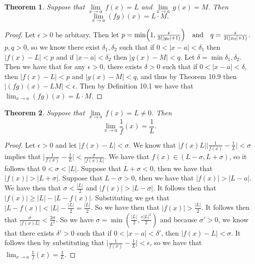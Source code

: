 \documentclass[12pt]{article}
\providecommand{\abs}[1]{\lvert #1 \rvert}
\providecommand{\sarr}{\rightarrow}
\renewcommand{\_}[1]{\underline{ #1 }}
\newtheorem{theorem}{Theorem}[section]
\theoremstyle{definition}
\numberwithin{equation}{subsection}
\begin{document}
\begin{theorem} Suppose that $\underset{x \sarr a}{\lim} \, f(x) = L$ and $\underset{x \sarr a}{\lim} \, g(x) = M$.  Then
\[
\lim_{x \sarr a} (f g)(x) = L \cdot M.
\]
\end{theorem}

\begin{proof}
Let $\epsilon > 0$ be arbitary. Then let $p = \min \Bigl( 1, \frac{\epsilon}{2(\abs{y_0} + 1)} \Bigr) \quad \text{and} \quad q = \frac{\epsilon}{2 (\abs{x_0} + 1)}$. $p,q > 0$, so we know there exist $\delta_1,\delta_2$ such that if $0 < \abs{x - a} < \delta_1$ then $\abs{f(x) - L} < p$ and if $\abs{x - a} < \delta_2$ then $\abs{g(x) - M} < q$. Let $\delta = \min{\delta_1, \delta_2}$. Then we have that for any $\epsilon > 0$, there exists $\delta > 0$ such that if $0 < \abs{x - a} < \delta$, then $\abs{f(x) - L} < p$ and $\abs{g(x) - M} < q$, and thus by Theorem 10.9 then $\abs{(fg)(x) - LM} < \epsilon$. Then by Definition 10.1 we have that $\lim_{x \to a}(fg)(x) = L \cdot M$.
\end{proof}

\begin{theorem}  Suppose that $\underset{x \sarr a}{\lim} \, f(x) = L \neq 0$.  Then
\[
\lim_{x \sarr a} \frac{1}{f}(x) = \frac{1}{L}.
\]
\end{theorem}

\begin{proof}
Let $\epsilon > 0$ and let $\abs{f(x) - L} < \sigma$. We know that $\abs{f(x)L} \abs{\frac{1}{f(x)} - \frac{1}{L}} < \sigma$ implies that $\abs{\frac{1}{f(x)} - \frac{1}{L}} < \frac{\sigma}{\abs{f(x)L}}$. We have that $f(x) \in (L - \sigma, L + \sigma)$, so it follows that $0 < \sigma < \abs{L}$. Suppose that $L + \sigma < 0$, then we have that $\abs{f(x)} > \abs{L + \sigma}$. Suppose that $L - \sigma > 0$, then we have that $\abs{f(x)} > \abs{L - a}$. We have then that $\sigma < \frac{\abs{L}}{2}$ and $\abs{f(x)} > \abs{L - \sigma}$. It follows then that $\abs{f(x)} \geq \abs{L} - \abs{L - f(x)}$. Substituting we get that $\abs{L - f(x)} < \abs{L} - \frac{\abs{L}}{2} = \frac{\abs{L}}{2}$. So we have then that $\abs{f(x)}> \frac{\abs{L}}{2}$. It follows then that $\frac{\sigma}{\abs{f(x)L}} < \frac{2\sigma}{L^2}$. \newline
So we have $\sigma = \min(\frac{\abs{L}}{2}, \frac{\epsilon \abs{L}^2}{2})$ and because $\sigma' > 0$, we know that there exists $\delta' > 0$ such that if $0 < \abs{x - a} < \delta'$, then $\abs{f(x) - L} < \sigma$. It follows then by substituting that $\abs{\frac{1}{f(x)} - \frac{1}{L}} < \epsilon$, so we have that $\lim_{x \sarr a} \frac{1}{f}(x) = \frac{1}{L}$.
\end{proof}
\end{document}
